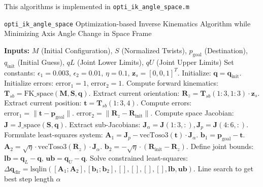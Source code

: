 \documentclass[english,10pt,a4paper]{book}
\begin{document}
		This algorithms is implemented in \texttt{opti\_ik\_angle\_space.m}
		\begin{algorithm}[H]
			\caption{\texttt{opti\_ik\_angle\_space} Optimization-based Inverse Kinematics Algorithm while Minimizing Axis Angle Change in Space Frame}
			\begin{algorithmic}[1]
				\State \textbf{Inputs:} $M$ (Initial Configuration), $S$ (Normalized Twists), $p_{\text{goal}}$ (Destination), $q_{\text{init}}$ (Initial Guess), $qL$ (Joint Lower Limits), $qU$ (Joint Upper Limits)
				\State Set constants: \( \epsilon_1 = 0.003 \), \( \epsilon_2 = 0.01 \), \( \eta = 0.1 \), \( \mathbf{z}_s = [0, 0, 1]^T \).
				\State Initialize: \( \mathbf{q} = \mathbf{q}_{\text{init}} \).
				\State Initialize errors: \( \text{error}_1 = 1 \), \( \text{error}_2 = 1 \).
				\State Compute forward kinematics: \( \mathbf{T}_{sb} = \text{FK\_space}(\mathbf{M}, \mathbf{S}, \mathbf{q}) \).
				\State Extract current orientation: \( \mathbf{R}_z = \mathbf{T}_{sb}(1:3, 1:3) \cdot \mathbf{z}_s \).
				\State Extract current position: \( \mathbf{t} = \mathbf{T}_{sb}(1:3, 4) \).
				\State Compute errors:
				\State \quad \( \text{error}_1 = \|\mathbf{t} - \mathbf{p}_{\text{goal}}\| \).
				\State \quad \( \text{error}_2 = \|\mathbf{R}_z - \mathbf{R}_{\text{init}}\| \).
				\State Compute space Jacobian: \( \mathbf{J} = \text{J\_space}(\mathbf{S}, \mathbf{q}) \).
				\State Extract sub-Jacobians: \( \mathbf{J}_\alpha = \mathbf{J}(1:3, :), \mathbf{J}_p = \mathbf{J}(4:6, :) \).
				\State Formulate least-squares system:
				\State \quad \( \mathbf{A}_1 = \mathbf{J}_p - \text{vecToso3}(\mathbf{t}) \cdot \mathbf{J}_\alpha \).
				\State \quad \( \mathbf{b}_1 = \mathbf{p}_{\text{goal}} - \mathbf{t} \).
				\State \quad \( \mathbf{A}_2 = \sqrt{\eta} \cdot \text{vecToso3}(\mathbf{R}_z) \cdot \mathbf{J}_\alpha \).
				\State \quad \( \mathbf{b}_2 = -\sqrt{\eta} \cdot (\mathbf{R}_{\text{init}} - \mathbf{R}_z) \).
				\State Define joint bounds: \( \mathbf{lb} = \mathbf{q}_L - \mathbf{q} \), \( \mathbf{ub} = \mathbf{q}_U - \mathbf{q} \).
				\State Solve constrained least-squares: \( \Delta \mathbf{q}_{\text{dir}} = \text{lsqlin}([\mathbf{A}_1; \mathbf{A}_2], [\mathbf{b}_1; \mathbf{b}_2], [], [], [], [], \mathbf{lb}, \mathbf{ub}) \).
				\State Line search to get best step length $\alpha$

\end{algorithmic}
\end{algorithm}
\end{document}
